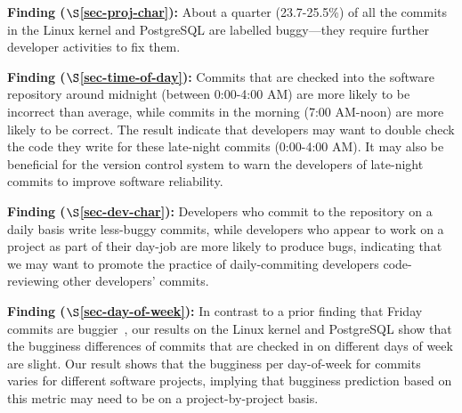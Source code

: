\begin{list}{}{\topsep=0pt\parsep=0pt\leftmargin=9pt\itemindent=0pt}

\item {\bf Finding \fbuggy ($\S$\ref{sec-proj-char}):} 
About a quarter (23.7-25.5\%) of all the commits in the Linux kernel and PostgreSQL are labelled buggy---they require further developer activities to fix them.

\item {\bf Finding \fhour ($\S$\ref{sec-time-of-day}):} 
Commits that are checked into the software repository around midnight (between 0:00-4:00 AM) 
are more likely to be incorrect than average, while commits in the morning (7:00 AM-noon) 
are more likely to be correct.
The result indicate that developers may want to double check the code they write for these 
late-night commits (0:00-4:00 AM).
It may also be beneficial for the version control
system to warn the developers of late-night commits to improve software reliability. 


\item {\bf Finding \fdaily ($\S$\ref{sec-dev-char}):} 
Developers who commit to the repository on a daily basis
write less-buggy commits, while developers who appear to work on a project
as part of their day-job are more likely to produce
bugs, indicating that we may 
want to promote the practice of daily-commiting developers code-reviewing other 
developers' commits.


\item {\bf Finding \fday ($\S$\ref{sec-day-of-week}):} 
In contrast to a prior finding that Friday commits are buggier~\cite{sliwerski-msr-2005}, 
our results on the Linux kernel and PostgreSQL show that 
the bugginess differences of commits that are checked in on different days of week 
are slight. Our result shows that the bugginess per day-of-week for commits
varies for different software projects, implying that bugginess prediction based on this 
metric may need to be on a project-by-project basis.

\end{list}


